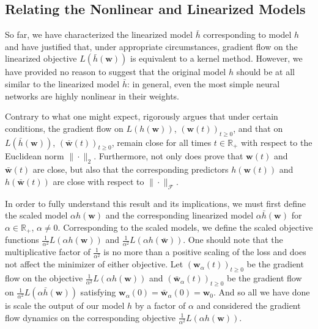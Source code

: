\documentclass{article}
\begin{document}
\subsection{Relating the Nonlinear and Linearized Models}\label{kerneltheory}

So far, we have characterized the linearized model $\bar{h}$ corresponding to model $h$ and have justified that, under appropriate circumstances, gradient flow on the linearized objective $L(\bar{h}(\boldsymbol{w}))$ is equivalent to a kernel method. However, we have provided no reason to suggest that the original model $h$ should be at all similar to the linearized model $\bar{h}$: in general, even the most simple neural networks are highly nonlinear in their weights. 

Contrary to what one might expect, \cite{chizat2018lazy} rigorously argues that under certain conditions, the gradient flow on $L(h(\boldsymbol{w}))$, $(\boldsymbol{w}(t))_{t \geq 0}$, and that on $L(\bar{h}(\boldsymbol{w}))$, $(\boldsymbol{\bar{w}}(t))_{t \geq 0}$, remain close for all times $t \in \mathbb{R}_+$ with respect to the Euclidean norm $\| \cdot \|_2$. Furthermore, not only does \cite{chizat2018lazy} prove that $\boldsymbol{w}(t)$ and $\boldsymbol{\bar{w}}(t)$ are close, but also that the corresponding predictors $h(\boldsymbol{w}(t))$ and $h(\boldsymbol{\bar{w}}(t))$ are close with respect to $\| \cdot \|_{\mathcal{F}}$.

In order to fully understand this result and its implications, we must first define the scaled model $\alpha h(\boldsymbol{w})$ and the corresponding linearized model $\alpha \bar{h}(\boldsymbol{w})$ for $\alpha \in \mathbb{R}_+$, $\alpha \neq 0$. Corresponding to the scaled models, we define the scaled objective functions $\frac{1}{\alpha^2}L(\alpha h(\boldsymbol{w}))$ and $\frac{1}{\alpha^2}L(\alpha h(\boldsymbol{\bar{w}}))$. One should note that the multiplicative factor of $\frac{1}{\alpha^2}$ is no more than a positive scaling of the loss and does not affect the minimizer of either objective. Let $(\boldsymbol{w}_{\alpha}(t))_{t \geq 0}$ be the gradient flow on the objective $\frac{1}{\alpha^2}L(\alpha h(\boldsymbol{w}))$ and $(\boldsymbol{\bar{w}}_{\alpha}(t))_{t \geq 0}$ be the gradient flow on $\frac{1}{\alpha^2}L(\alpha \bar{h}(\boldsymbol{w}))$ satisfying $\boldsymbol{w}_{\alpha}(0) = \boldsymbol{\bar{w}}_{\alpha}(0) = \boldsymbol{w}_0$. And so all we have done is scale the output of our model $h$ by a factor of $\alpha$ and considered the gradient flow dynamics on the corresponding objective $\frac{1}{\alpha^2}L(\alpha h(\boldsymbol{w}))$.
\end{document}
